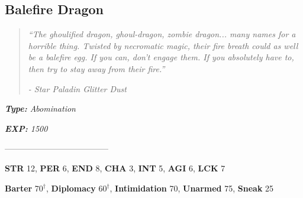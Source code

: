 \documentclass[11pt,a4paper,twocolumn]{book}
\begin{document}
	\clearpage
	
	\subsection*{Balefire Dragon}	
	\begin{quote}
		\emph{``The ghoulified dragon, ghoul-dragon, zombie dragon... many names for a horrible thing. Twisted by necromatic magic, their fire breath could as well be a balefire egg. If you can, don't engage them. If you absolutely have to, then try to stay away from their fire.''}
		
		\emph{-	Star Paladin Glitter Dust}
	\end{quote}
	
	\noindent
	\emph{\textbf{Type:} Abomination}
	
	\noindent
	\emph{\textbf{EXP:} 1500}
	
%		
%	
%		

	--------------------------------------

	\noindent
	\textbf{STR} 12, \textbf{PER} 6, \textbf{END} 8, \textbf{CHA} 3, \textbf{INT} 5, \textbf{AGI} 6, \textbf{LCK} 7
	
	\noindent
	\textbf{Barter} 70$^{\dag}$, \textbf{Diplomacy} 60$^{\dag}$, \textbf{Intimidation} 70, \textbf{Unarmed} 75, \textbf{Sneak} 25
	
\end{document}
